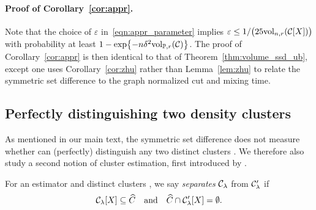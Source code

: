 \paragraph{Proof of Corollary~\ref{cor:appr}.}
	Note that the choice of $\varepsilon$ in~\eqref{eqn:appr_parameter} implies $\varepsilon \leq 1/\bigl(25\mathrm{vol}_{n,r}(\mathcal{C}[X])\bigr)$ with probability at least $1 - \exp\bigl\{-n\delta^2\mathrm{vol}_{\mathbb{P},r}(\mathcal{C})\bigr\}$. The proof of Corollary~\ref{cor:appr} is then identical to that of Theorem~\ref{thm:volume_ssd_ub}, except one uses Corollary~\ref{cor:zhu} rather than Lemma~\ref{lem:zhu} to relate the symmetric set difference to the graph normalized cut and mixing time.

\subsection{Perfectly distinguishing two density clusters}
\label{subsec:consistent_recovery_density_clusters}

As mentioned in our main text, the symmetric set difference does not measure whether 
can (perfectly) distinguish any two distinct clusters . We therefore also study a second notion of cluster 
estimation, first introduced by \citet{hartigan1981}.

\begin{definition}
	\label{def:density_cluster_consistency}
	For an estimator  and distinct clusters , we say  \emph{separates} $\mathcal{C}_{\lambda}$ from $\mathcal{C}_{\lambda}'$ if 
	\begin{equation}
	\label{eqn:density_cluster_consistency}
	\mathcal{C}_{\lambda}[X] \subseteq \widehat{C} \quad \text{and} \quad
	\widehat{C} \cap \mathcal{C}_{\lambda}'[X] = \emptyset.
	\end{equation}
\end{definition}

